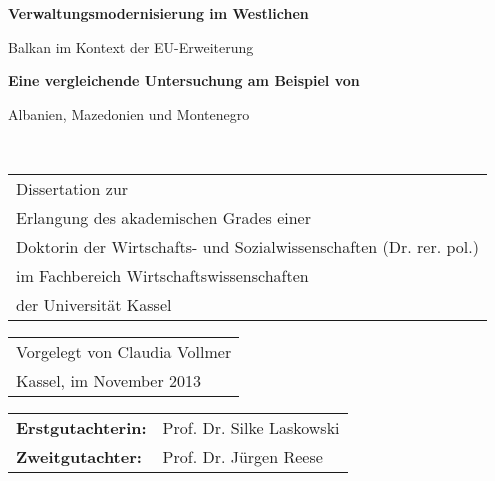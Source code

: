 \pagestyle{empty} 


\newpage
\setlength{\voffset}{20mm}
\begin{center}

{\LARGE \bfseries Verwaltungsmodernisierung im Westlichen \par Balkan im Kontext der EU-Erweiterung}

\vspace{10mm}

 {\Large\bfseries  Eine vergleichende Untersuchung am Beispiel von \par Albanien, Mazedonien und Montenegro}\\
\end{center}
\vspace{70mm}
\begin{large}
\begin{tabular}{p{180mm}}
Dissertation zur \\
Erlangung des akademischen Grades einer \\
Doktorin der Wirtschafts- und Sozialwissenschaften (Dr. rer. pol.) \\
im Fachbereich Wirtschaftswissenschaften\\
der Universität Kassel\\
\end{tabular}

\vspace{1cm}

\begin{tabular}{p{24cm}}
Vorgelegt von Claudia Vollmer\\
Kassel, im November 2013\\
\end{tabular}
\newpage
\vspace{1cm}

\begin{tabular}{ll}
{\bf Erstgutachterin:} &  Prof. Dr. Silke Laskowski\\
{\bf Zweitgutachter:}&Prof. Dr. Jürgen Reese\\
\end{tabular}
\end{large}
\clearpage
\setlength{\voffset}{0mm}
%

%

%
  
\pagestyle{useheadings} 

